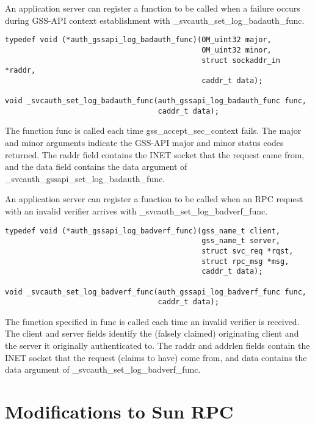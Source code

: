 An application server can register a function to be called when a
failure occurs during GSS-API context establishment with
_svcauth_set_log_badauth_func.

\begin{verbatim}
typedef void (*auth_gssapi_log_badauth_func)(OM_uint32 major,
                                             OM_uint32 minor,
                                             struct sockaddr_in *raddr,
                                             caddr_t data);
   
void _svcauth_set_log_badauth_func(auth_gssapi_log_badauth_func func,
                                   caddr_t data); 
\end{verbatim}

The function func is called each time gss_accept_sec_context fails.
The major and minor arguments indicate the GSS-API major and minor
status codes returned.  The raddr field contains the INET socket that
the request came from, and the data field contains the data argument
of _svcauth_gssapi_set_log_badauth_func.

An application server can register a function to be called when an RPC
request with an invalid verifier arrives with
_svcauth_set_log_badverf_func.

\begin{verbatim}
typedef void (*auth_gssapi_log_badverf_func)(gss_name_t client,
                                             gss_name_t server,
                                             struct svc_req *rqst,
                                             struct rpc_msg *msg,
                                             caddr_t data);

void _svcauth_set_log_badverf_func(auth_gssapi_log_badverf_func func,
                                   caddr_t data); 
\end{verbatim}

The function specified in func is called each time an invalid verifier
is received.  The client and server fields identify the (falsely
claimed) originating client and the server it originally authenticated
to.  The raddr and addrlen fields contain the INET socket that the
request (claims to have) come from, and data contains the data
argument of _svcauth_set_log_badverf_func.

\section{Modifications to Sun RPC}


